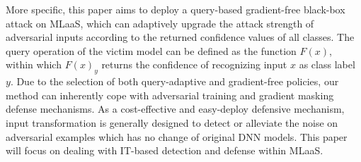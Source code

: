 \documentclass[lettersize,journal]{IEEEtran}
\begin{document}
More specific, this paper aims to deploy a query-based gradient-free black-box attack on MLaaS, which can adaptively upgrade the attack strength of adversarial inputs according to the returned confidence values of all classes. The query operation of the victim model can be defined as the function $F(x)$, within which $F(x)_y$ returns the confidence of recognizing input $x$ as class label $y$. Due to the selection of both query-adaptive and gradient-free policies, our method can inherently cope with adversarial training and gradient masking defense mechanisms. As a cost-effective and easy-deploy defensive mechanism, input transformation is generally designed to detect or alleviate the noise on adversarial examples which has no change of original DNN models. This paper will focus on dealing with IT-based detection and defense within MLaaS.    
\end{document}
